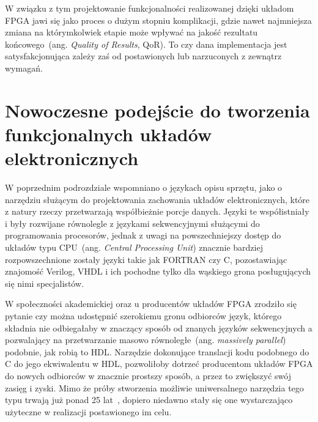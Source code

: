 W związku z tym projektowanie funkcjonalności realizowanej dzięki układom FPGA jawi się jako proces o dużym stopniu komplikacji, gdzie nawet najmniejsza zmiana na którymkolwiek etapie może wpływać na jakość rezultatu końcowego~(ang. \textit{Quality of Results}, QoR). To czy dana implementacja jest satysfakcjonująca zależy zaś od postawionych lub narzuconych z zewnątrz wymagań. 

\section{Nowoczesne podejście do tworzenia funkcjonalnych układów elektronicznych}
W poprzednim podrozdziale wspomniano o językach opisu sprzętu, jako o narzędziu służącym do projektowania zachowania układów elektronicznych, które z natury rzeczy przetwarzają współbieżnie porcje danych. Języki te współistniały i były rozwijane równolegle z językami sekwencyjnymi służącymi do programowania procesorów, jednak z uwagi na powszechniejszy dostęp do układów typu CPU~(ang. \textit{Central Processing Unit}) znacznie bardziej rozpowszechnione zostały języki takie jak FORTRAN czy C, pozostawiając znajomość Verilog, VHDL i ich pochodne tylko dla wąskiego grona posługujących się nimi specjalistów.

W społeczności akademickiej oraz u producentów układów FPGA zrodziło się pytanie czy można udostępnić szerokiemu gronu odbiorców język, którego składnia nie odbiegałaby w znaczący sposób od znanych języków sekwencyjnych a pozwalający na przetwarzanie masowo równoległe~(ang. \textit{massively parallel}) podobnie, jak robią to HDL. Narzędzie dokonujące translacji kodu podobnego do C do jego ekwiwalentu w HDL, pozwoliłoby dotrzeć producentom układów FPGA do nowych odbiorców w znacznie prostszy sposób, a przez to zwiększyć swój zasięg i zyski. Mimo że próby stworzenia możliwie uniwersalnego narzędzia tego typu trwają już ponad 25 lat~\cite{C_VHDL}, dopiero niedawno stały się one wystarczająco użyteczne w realizacji postawionego im celu. 

